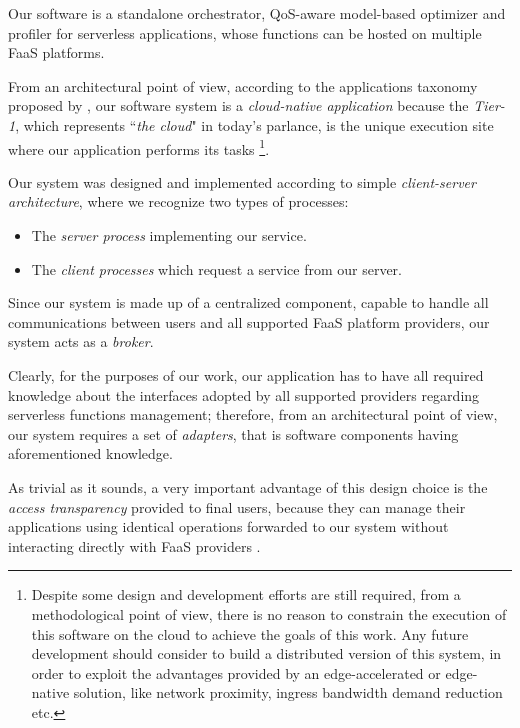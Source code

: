 \documentclass[12pt,a4paper]{report}
\newcommand{\ItalicQuotMark}[1]{``\textit{#1}"}
\begin{document}
Our software is a standalone orchestrator, QoS-aware model-based optimizer and profiler for serverless applications, whose functions can be hosted on multiple FaaS platforms.

From an architectural point of view, according to the applications taxonomy proposed by \citet{MSA}, our software system is a \textit{cloud-native application} because the \textit{Tier-1}, which represents \ItalicQuotMark{the cloud} in today’s parlance, is the unique execution site where our application performs its tasks \footnote{Despite some design and development efforts are still required, from a methodological point of view, there is no reason to constrain the execution of this software on the cloud to achieve the goals of this work. Any future development should consider to build a distributed version of this system, in order to exploit the advantages provided by an edge-accelerated or edge-native solution, like network proximity, ingress bandwidth demand reduction etc.}.

Our system was designed and implemented according to simple \textit{client-server architecture}, where we recognize two types of processes:

\begin{itemize}
	\item The \textit{server process} implementing our service.
	
	\item The \textit{client processes} which request a service from our server.
\end{itemize}


Since our system is made up of a centralized component, capable to handle all communications between users and all supported FaaS platform providers, our system acts as a \textit{broker}.

Clearly, for the purposes of our work, our application has to have all required knowledge about the interfaces adopted by all supported providers regarding serverless functions management; therefore, from an architectural point of view, our system requires a set of \textit{adapters}\cite{SDCC}, that is software components having aforementioned knowledge. 

As trivial as it sounds, a very important advantage of this design choice is the \textit{access transparency} provided to final users, because they can manage their applications using identical operations forwarded to our system without interacting directly with FaaS providers \cite{SDCC}.
\end{document}

